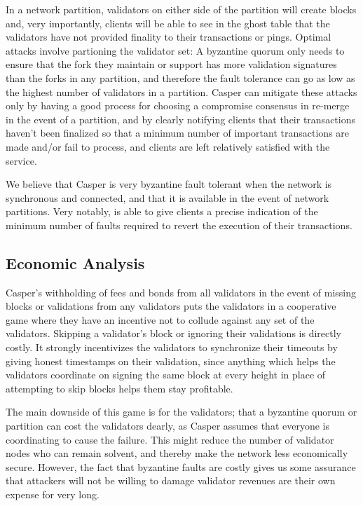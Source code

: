 \documentclass[11pt,a4paper]{article}
\begin{document}
In a network partition, validators on either side of the partition will create blocks and, very importantly, clients will be able to see in the ghost table that the validators have not provided finality to their transactions or pings. Optimal attacks involve partioning the validator set: A byzantine quorum only needs to ensure that the fork they maintain or support has more validation signatures than the forks in any partition, and therefore the fault tolerance can go as low as the highest number of validators in a partition. Casper can mitigate these attacks only by having a good process for choosing a compromise consensus in re-merge in the event of a partition, and by clearly notifying clients that their transactions haven't been finalized so that a minimum number of important transactions are made and/or fail to process, and clients are left relatively satisfied with the service.

We believe that Casper is very byzantine fault tolerant when the network is synchronous and connected, and that it is available in the event of network partitions. Very notably, is able to give clients a precise indication of the minimum number of faults required to revert the execution of their transactions.


\subsection{Economic Analysis}


Casper's withholding of fees and bonds from all validators in the event of missing blocks or validations from any validators puts the validators in a cooperative game where they have an incentive not to collude against any set of the validators. Skipping a validator's block or ignoring their validations is directly costly. It strongly incentivizes the validators to synchronize their timeouts by giving honest timestamps on their validation, since anything which helps the validators coordinate on signing the same block at every height in place of attempting to skip blocks helps them stay profitable. 

The main downside of this game is for the validators; that a byzantine quorum or partition can cost the validators dearly, as Casper assumes that everyone is coordinating to cause the failure. This might reduce the number of validator nodes who can remain solvent, and thereby make the network less economically secure. However, the fact that byzantine faults are costly gives us some assurance that attackers will not be willing to damage validator revenues are their own expense for very long.
\end{document}
